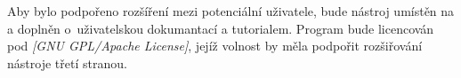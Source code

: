 \documentclass[a4paper]{article}
\begin{document}
\begin{enumerate}
        Aby bylo podpořeno rozšíření mezi potenciální uživatele, bude nástroj
        umístěn na \cite{parasim_web} a doplněn o~uživatelskou dokumantací a tutorialem.
        Program bude licencován pod \emph{[GNU GPL/Apache License]}, jejíž volnost
        by měla podpořit rozšiřování nástroje třetí stranou.

%
%
%
%
%


\end{enumerate}
\end{document}
